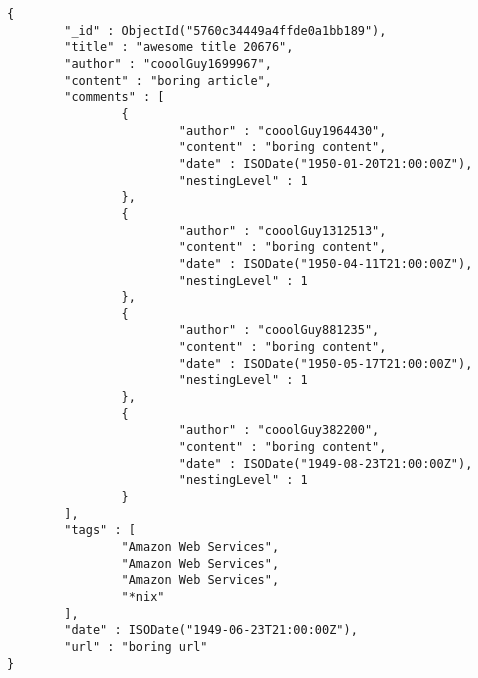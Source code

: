 \documentclass[a4paper]{article}
\begin{document}
\begin{verbatim}
{                                                                    
        "_id" : ObjectId("5760c34449a4ffde0a1bb189"),                
        "title" : "awesome title 20676",                             
        "author" : "cooolGuy1699967",                                
        "content" : "boring article",                                
        "comments" : [                                               
                {                                                    
                        "author" : "cooolGuy1964430",                
                        "content" : "boring content",                
                        "date" : ISODate("1950-01-20T21:00:00Z"),    
                        "nestingLevel" : 1                           
                },                                                   
                {                                                    
                        "author" : "cooolGuy1312513",                
                        "content" : "boring content",                
                        "date" : ISODate("1950-04-11T21:00:00Z"),    
                        "nestingLevel" : 1                           
                },                                                   
                {                                                    
                        "author" : "cooolGuy881235",                 
                        "content" : "boring content",                
                        "date" : ISODate("1950-05-17T21:00:00Z"),    
                        "nestingLevel" : 1                           
                },                                                   
                {                                                    
                        "author" : "cooolGuy382200",                 
                        "content" : "boring content",                
                        "date" : ISODate("1949-08-23T21:00:00Z"),    
                        "nestingLevel" : 1                           
                }                                                    
        ],                                                           
        "tags" : [                                                   
                "Amazon Web Services",                               
                "Amazon Web Services",                               
                "Amazon Web Services",                               
                "*nix"                                               
        ],                                                           
        "date" : ISODate("1949-06-23T21:00:00Z"),                    
        "url" : "boring url"                                         
}
\end{verbatim}
\end{document}
